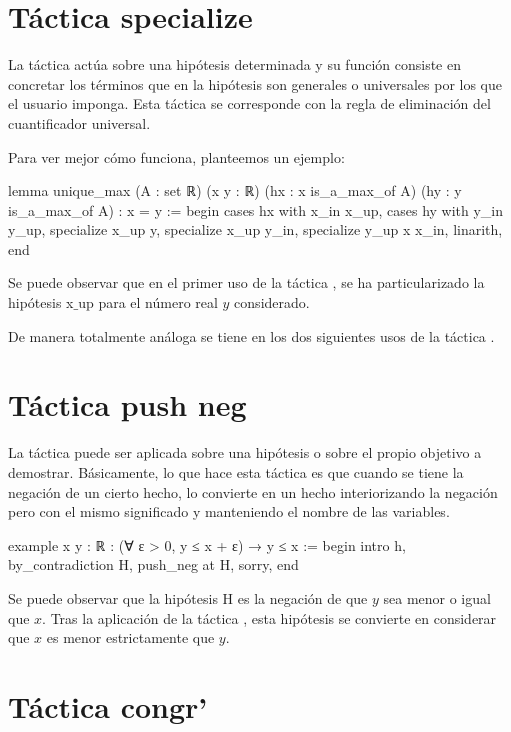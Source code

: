 \section{Táctica specialize}

La táctica  actúa sobre una hipótesis
determinada y su función consiste en concretar los términos que en la
hipótesis son generales o universales por los que el usuario
imponga. Esta táctica se corresponde con la regla de eliminación del
cuantificador universal.

Para ver mejor cómo funciona, planteemos un ejemplo:
\begin{leancode}
lemma unique_max
  (A : set ℝ)
  (x y : ℝ)
  (hx : x is_a_max_of A)
  (hy : y is_a_max_of A) :
  x = y :=
begin
  cases hx with x_in x_up,
  cases hy with y_in y_up,
  specialize x_up y,
  specialize x_up y_in,
  specialize y_up x x_in,
  linarith,
end
\end{leancode}

Se puede observar que en el primer uso de la táctica
, se ha particularizado la hipótesis x\(\_\)up
para el número real \(y\) considerado.

De manera totalmente análoga se tiene en los dos siguientes usos de la táctica
.

\section{Táctica push neg}

La táctica  puede ser aplicada sobre una
hipótesis o sobre el propio objetivo a demostrar. Básicamente, lo que
hace esta táctica es que cuando se tiene la negación de un cierto hecho,
lo convierte en un hecho interiorizando la negación pero con el mismo
significado y manteniendo el nombre de las variables.

\begin{leancode}
example {x y : ℝ} : (∀ ε > 0, y ≤ x + ε) →  y ≤ x :=
begin
  intro h,
  by_contradiction H,
  push_neg at H,
  sorry,
end
\end{leancode}

Se puede observar que la hipótesis H es la negación de que \(y\) sea menor o
igual que \(x\). Tras la aplicación de la táctica ,
esta hipótesis se convierte en considerar que \(x\) es menor estrictamente que
\(y\).

\section{Táctica congr'}

